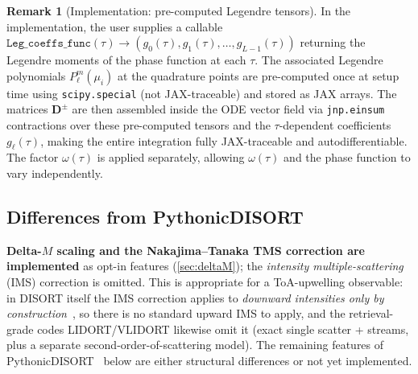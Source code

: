 \documentclass[11pt,a4paper]{article}
\newcommand{\mat}[1]{\mathbf{#1}}
\theoremstyle{definition}
\newtheorem{remark}{Remark}
\begin{document}
\begin{remark}[Implementation: pre-computed Legendre tensors]
In the implementation, the user supplies a callable
$\texttt{Leg\_coeffs\_func}(\tau) \to (g_0(\tau), g_1(\tau), \ldots,
g_{L-1}(\tau))$ returning the Legendre moments of the phase function at
each $\tau$.  The associated Legendre polynomials $P_\ell^m(\mu_i)$ at
the quadrature points are pre-computed once at setup time using
\texttt{scipy.special} (not JAX-traceable) and stored as JAX arrays.
The matrices $\mat{D}^\pm$ are then assembled inside the ODE vector
field via \texttt{jnp.einsum} contractions over these pre-computed
tensors and the $\tau$-dependent coefficients $g_\ell(\tau)$, making
the entire integration fully JAX-traceable and autodifferentiable.
The factor $\omega(\tau)$ is applied separately, allowing $\omega(\tau)$
and the phase function to vary independently.
\end{remark}

\subsection{Differences from PythonicDISORT}\label{sec:differences}

\textbf{Delta-$M$ scaling and the Nakajima--Tanaka TMS correction are
implemented} as opt-in features (\cref{sec:deltaM}); the
\emph{intensity multiple-scattering} (IMS) correction is omitted.  This is
appropriate for a ToA-upwelling observable: in DISORT itself the IMS correction
applies to \emph{downward intensities only by construction}~\cite{STWLE2000}, so
there is no standard upward IMS to apply, and the retrieval-grade codes
LIDORT/VLIDORT likewise omit it (exact single scatter + streams, plus a separate
second-order-of-scattering model).  The remaining features of
PythonicDISORT~\cite{HP2024doc} below are either structural differences or not
yet implemented.
\end{document}
